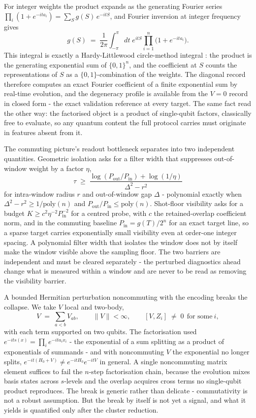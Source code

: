 For integer weights the product expands as the generating Fourier series $\prod_i (1 + e^{-i t a_i}) = \sum_S g(S)\, e^{-i t S}$, and Fourier inversion at integer frequency gives
\[
g(S) \;=\; \frac{1}{2\pi} \int_{-\pi}^{\pi} dt\; e^{i t S} \prod_{i=1}^{n} \bigl(1 + e^{-i t a_i}\bigr).
\]
This integral is exactly a Hardy-Littlewood circle-method integral \cite{vaughan1997hardy}: the product is the generating exponential sum of $\{0,1\}^n$, and the coefficient at $S$ counts the representations of $S$ as a $\{0,1\}$-combination of the weights. The diagonal record therefore computes an exact Fourier coefficient of a finite exponential sum by real-time evolution, and the degeneracy profile is available from the $V = 0$ record in closed form - the exact validation reference at every target. The same fact read the other way: the factorised object is a product of single-qubit factors, classically free to evaluate, so any quantum content the full protocol carries must originate in features absent from it.

The commuting picture's readout bottleneck separates into two independent quantities. Geometric isolation asks for a filter width that suppresses out-of-window weight by a factor $\eta$,
\[
\tau \;\ge\; \frac{\log(P_{\mathrm{out}}/P_{\mathrm{in}}) + \log(1/\eta)}{\Delta^2 - r^2}
\]
for intra-window radius $r$ and out-of-window gap $\Delta$ - polynomial exactly when $\Delta^2 - r^2 \ge 1/\mathrm{poly}(n)$ and $P_{\mathrm{out}}/P_{\mathrm{in}} \le \mathrm{poly}(n)$. Shot-floor visibility asks for a budget $K \ge c^2 \eta^{-2} P_{\mathrm{in}}^{-2}$ for a centred probe, with $c$ the retained-overlap coefficient norm, and in the commuting baseline $P_{\mathrm{in}} = g(T)/2^n$ for an exact target line, so a sparse target carries exponentially small visibility even at order-one integer spacing. A polynomial filter width that isolates the window does not by itself make the window visible above the sampling floor. The two barriers are independent and must be cleared separately - the perturbed diagnostics ahead change what is measured within a window and are never to be read as removing the visibility barrier.

A bounded Hermitian perturbation noncommuting with the encoding breaks the collapse. We take $V$ local and two-body,
\begin{equation}\label{def:bounded-noncommuting-V}
V \;=\; \sum_{a<b} V_{ab}, \qquad \|V\| < \infty, \qquad [V, Z_i] \;\neq\; 0 \ \ \text{for some}\ i,
\end{equation}
with each term supported on two qubits. The factorisation used $e^{-i t s(x)} = \prod_i e^{-i t a_i x_i}$ - the exponential of a sum splitting as a product of exponentials of summands - and with noncommuting $V$ the exponential no longer splits, $e^{-i t (H_0 + V)} \neq e^{-i t H_0} e^{-i t V}$ in general. A single noncommuting matrix element suffices to fail the $n$-step factorisation chain, because the evolution mixes basis states across $s$-levels and the overlap acquires cross terms no single-qubit product reproduces. The break is generic rather than delicate - commutativity is not a robust assumption. But the break by itself is not yet a signal, and what it yields is quantified only after the cluster reduction.

